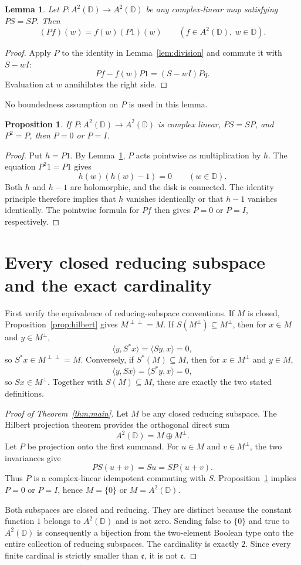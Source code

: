 \documentclass[11pt]{article}
\newtheorem{lemma}[theorem]{Lemma}
\newtheorem{proposition}[theorem]{Proposition}
\newcommand{\D}{\mathbb D}
\newcommand{\A}{A^2(\D)}
\newcommand{\ip}[2]{\langle #1,#2\rangle}
\begin{document}
\begin{lemma}\label{lem:multiplier}
Let $P:\A\to\A$ be any complex-linear map satisfying $PS=SP$. Then
\[
 (Pf)(w)=f(w)(P1)(w)\qquad(f\in\A,\ w\in\D).
\]
\end{lemma}
\begin{proof}
Apply $P$ to the identity in Lemma~\ref{lem:division} and commute it with
$S-wI$:
\[
 Pf-f(w)P1=(S-wI)Pq.
\]
Evaluation at $w$ annihilates the right side.
\end{proof}
No boundedness assumption on $P$ is used in this lemma.

\begin{proposition}\label{prop:idempotent}
If $P:\A\to\A$ is complex linear, $PS=SP$, and $P^2=P$, then $P=0$ or
$P=I$.
\end{proposition}
\begin{proof}
Put $h=P1$. By Lemma~\ref{lem:multiplier}, $P$ acts pointwise as
multiplication by $h$. The equation $P^2 1=P1$ gives
\[
 h(w)(h(w)-1)=0\qquad(w\in\D).
\]
Both $h$ and $h-1$ are holomorphic, and the disk is connected. The identity
principle therefore implies that $h$ vanishes identically or that $h-1$
vanishes identically. The pointwise formula for $Pf$ then gives $P=0$ or
$P=I$, respectively.
\end{proof}

\section{Every closed reducing subspace and the exact cardinality}
First verify the equivalence of reducing-subspace conventions. If $M$ is
closed, Proposition~\ref{prop:hilbert} gives $M^{\perp\perp}=M$. If
$S(M^\perp)\subseteq M^\perp$, then for $x\in M$ and $y\in M^\perp$,
\[
 \ip{y}{S^*x}=\ip{Sy}{x}=0,
\]
so $S^*x\in M^{\perp\perp}=M$. Conversely, if $S^*(M)\subseteq M$, then
for $x\in M^\perp$ and $y\in M$,
\[
 \ip{y}{Sx}=\ip{S^*y}{x}=0,
\]
so $Sx\in M^\perp$. Together with $S(M)\subseteq M$, these are exactly
the two stated definitions.

\begin{proof}[Proof of Theorem~\ref{thm:main}]
Let $M$ be any closed reducing subspace. The Hilbert projection theorem
provides the orthogonal direct sum
\[
 \A=M\oplus M^\perp.
\]
Let $P$ be projection onto the first summand. For $u\in M$ and
$v\in M^\perp$, the two invariances give
\[
 PS(u+v)=Su=SP(u+v).
\]
Thus $P$ is a complex-linear idempotent commuting with $S$.
Proposition~\ref{prop:idempotent} implies $P=0$ or $P=I$, hence
$M=\{0\}$ or $M=\A$.

Both subspaces are closed and reducing. They are distinct because the
constant function $1$ belongs to $\A$ and is not zero. Sending
$\mathrm{false}$ to $\{0\}$ and $\mathrm{true}$ to $\A$ is consequently a
bijection from the two-element Boolean type onto the entire collection of
reducing subspaces. The cardinality is exactly $2$. Since every finite
cardinal is strictly smaller than $\mathfrak c$, it is not $\mathfrak c$.
\end{proof}
\end{document}
